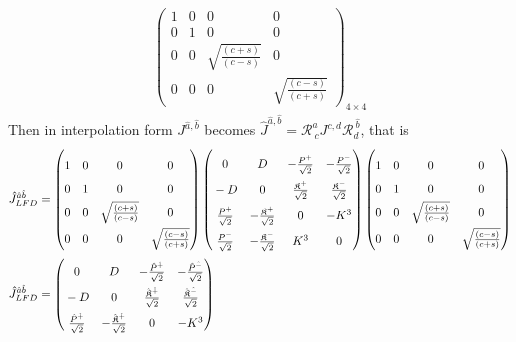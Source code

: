 \documentclass[]{article}
\numberwithin{equation}{section}
\begin{document}
{{\begin{align}
\begin{pmatrix}
    1&0&0&0\\
    0&1&0&0\\
    0&0&\sqrt{\frac{(c+s)}{(c-s)}}  & 0\\
    0&0&0 & \sqrt{\frac{(c-s)}{(c+s)}} 
    \end{pmatrix}_{4\times4}
\end{align}
Then in interpolation form $J^{\hat{a},\hat{b}}$ becomes $\hat{J}^{\hat{a},\hat{b}}=\mathcal{R}^{\hat{a}}_{~{c}}J^{c,d}\mathcal{R}^{~\hat{b}}_{{d}}$, that is
\begin{align}
    \hat{J}^{\hat{a}\hat{b}}_{LFD}&=\begin{pmatrix}
    \rule{0pt}{16pt} 1&0&0&0\\
    \rule{0pt}{16pt} 0&1&0&0\\
    \rule{0pt}{16pt} 0&0&\sqrt{\frac{(c+s)}{(c-s)}}  & 0\\
    \rule{0pt}{16pt} 0&0&0 & \sqrt{\frac{(c-s)}{(c+s)}} 
    \end{pmatrix}\begin{pmatrix}
    \rule{0pt}{16pt} 0&D&-\frac{P^{{+}}}{\sqrt{2}}&-\frac{P^{{-}}}{\sqrt{2}}\\
    \rule{0pt}{16pt} -D&0&\frac{\mathfrak{K}^{{+}}}{\sqrt{2}}&\frac{\mathfrak{K}^{{-}}}{\sqrt{2}}\\
    \rule{0pt}{16pt} \frac{P^{{+}}}{\sqrt{2}}&-\frac{\mathfrak{K}^{{+}}}{\sqrt{2}}&0  & -K^3\\
    \rule{0pt}{16pt} \frac{P^{{-}}}{\sqrt{2}}&-\frac{\mathfrak{K}^{{-}}}{\sqrt{2}}&K^3  & 0
  \end{pmatrix}\begin{pmatrix}
    \rule{0pt}{16pt} 1&0&0&0\\
    \rule{0pt}{16pt} 0&1&0&0\\
    \rule{0pt}{16pt} 0&0&\sqrt{\frac{(c+s)}{(c-s)}}  & 0\\
    \rule{0pt}{16pt} 0&0&0 & \sqrt{\frac{(c-s)}{(c+s)}} 
    \end{pmatrix}\\
     \hat{J}^{\hat{a}\hat{b}}_{LFD}&=\begin{pmatrix}
    \rule{0pt}{16pt} 0&D&-\frac{\hat{P}^{\hat{+}}}{\sqrt{2}}&-\frac{\hat{P}^{\hat{-}}}{\sqrt{2}}\\
    \rule{0pt}{16pt} -D&0&\frac{\hat{\mathfrak{K}}^{\hat{+}}}{\sqrt{2}}&\frac{\hat{\mathfrak{K}}^{\hat{-}}}{\sqrt{2}}\\
    \rule{0pt}{16pt} \frac{\hat{P}^{\hat{+}}}{\sqrt{2}}&-\frac{\hat{\mathfrak{K}}^{\hat{+}}}{\sqrt{2}}&0  & -K^3\\

\end{pmatrix}
\end{align}}}
\end{document}
